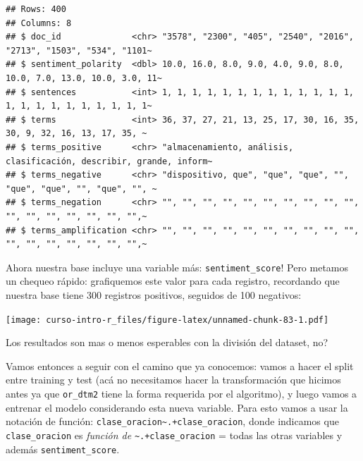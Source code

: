 \documentclass[
]{book}
\newenvironment{Shaded}{\begin{snugshade}}{\end{snugshade}}
\newcommand{\CommentTok}[1]{\textcolor[rgb]{0.56,0.35,0.01}{\textit{#1}}}
\newcommand{\FunctionTok}[1]{\textcolor[rgb]{0.00,0.00,0.00}{#1}}
\newcommand{\NormalTok}[1]{#1}
\newcommand{\OtherTok}[1]{\textcolor[rgb]{0.56,0.35,0.01}{#1}}
\newcommand{\SpecialCharTok}[1]{\textcolor[rgb]{0.00,0.00,0.00}{#1}}
\begin{document}
\begin{verbatim}
## Rows: 400
## Columns: 8
## $ doc_id              <chr> "3578", "2300", "405", "2540", "2016", "2713", "1503", "534", "1101~
## $ sentiment_polarity  <dbl> 10.0, 16.0, 8.0, 9.0, 4.0, 9.0, 8.0, 10.0, 7.0, 13.0, 10.0, 3.0, 11~
## $ sentences           <int> 1, 1, 1, 1, 1, 1, 1, 1, 1, 1, 1, 1, 1, 1, 1, 1, 1, 1, 1, 1, 1, 1, 1~
## $ terms               <int> 36, 37, 27, 21, 13, 25, 17, 30, 16, 35, 30, 9, 32, 16, 13, 17, 35, ~
## $ terms_positive      <chr> "almacenamiento, análisis, clasificación, describir, grande, inform~
## $ terms_negative      <chr> "dispositivo, que", "que", "que", "", "que", "que", "", "que", "", ~
## $ terms_negation      <chr> "", "", "", "", "", "", "", "", "", "", "", "", "", "", "", "", "",~
## $ terms_amplification <chr> "", "", "", "", "", "", "", "", "", "", "", "", "", "", "", "", "",~
\end{verbatim}

\begin{Shaded}
\end{Shaded}

Ahora nuestra base incluye una variable más: \texttt{sentiment\_score}!
Pero metamos un chequeo rápido: grafiquemos este valor para cada registro, recordando que nuestra base tiene 300 registros positivos, seguidos de 100 negativos:

\begin{Shaded}
\end{Shaded}

\texttt{[image: curso-intro-r\_files/figure-latex/unnamed-chunk-83-1.pdf]}

Los resultados son mas o menos esperables con la división del dataset, no?

Vamos entonces a seguir con el camino que ya conocemos: vamos a hacer el split entre training y test (acá no necesitamos hacer la transformación que hicimos antes ya que \texttt{or\_dtm2} tiene la forma requerida por el algoritmo), y luego vamos a entrenar el modelo considerando esta nueva variable. Para esto vamos a usar la notación de función: \texttt{clase\_oracion\textasciitilde{}.+clase\_oracion}, donde indicamos que \texttt{clase\_oracion} es \emph{función de} \texttt{\textasciitilde{}.+clase\_oracion} = todas las otras variables y además \texttt{sentiment\_score}.
\end{document}
